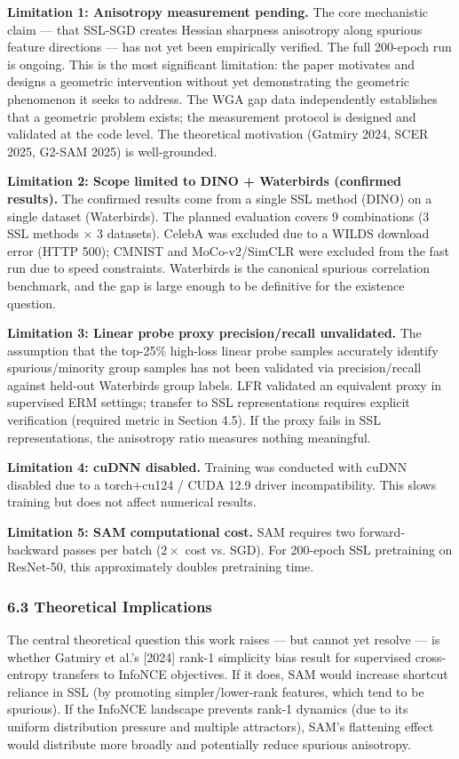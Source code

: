 \textbf{Limitation 1: Anisotropy measurement pending.}
The core mechanistic claim --- that SSL-SGD creates Hessian sharpness anisotropy along spurious feature directions --- has not yet been empirically verified. The full 200-epoch run is ongoing. This is the most significant limitation: the paper motivates and designs a geometric intervention without yet demonstrating the geometric phenomenon it seeks to address. The WGA gap data independently establishes that a geometric problem exists; the measurement protocol is designed and validated at the code level. The theoretical motivation (Gatmiry 2024, SCER 2025, G2-SAM 2025) is well-grounded.

\textbf{Limitation 2: Scope limited to DINO + Waterbirds (confirmed results).}
The confirmed results come from a single SSL method (DINO) on a single dataset (Waterbirds). The planned evaluation covers 9 combinations (3 SSL methods $\times$ 3 datasets). CelebA was excluded due to a WILDS download error (HTTP 500); CMNIST and MoCo-v2/SimCLR were excluded from the fast run due to speed constraints. Waterbirds is the canonical spurious correlation benchmark, and the gap is large enough to be definitive for the existence question.

\textbf{Limitation 3: Linear probe proxy precision/recall unvalidated.}
The assumption that the top-25\% high-loss linear probe samples accurately identify spurious/minority group samples has not been validated via precision/recall against held-out Waterbirds group labels. LFR \citep{ghaznavi2023lfr} validated an equivalent proxy in supervised ERM settings; transfer to SSL representations requires explicit verification (required metric in Section 4.5). If the proxy fails in SSL representations, the anisotropy ratio measures nothing meaningful.

\textbf{Limitation 4: cuDNN disabled.}
Training was conducted with cuDNN disabled due to a torch+cu124 / CUDA 12.9 driver incompatibility. This slows training but does not affect numerical results.

\textbf{Limitation 5: SAM computational cost.}
SAM requires two forward-backward passes per batch ($2\times$ cost vs. SGD). For 200-epoch SSL pretraining on ResNet-50, this approximately doubles pretraining time.

\subsubsection{6.3 Theoretical Implications}

The central theoretical question this work raises --- but cannot yet resolve --- is whether Gatmiry et al.'s [2024] rank-1 simplicity bias result for supervised cross-entropy transfers to InfoNCE objectives. If it does, SAM would increase shortcut reliance in SSL (by promoting simpler/lower-rank features, which tend to be spurious). If the InfoNCE landscape prevents rank-1 dynamics (due to its uniform distribution pressure and multiple attractors), SAM's flattening effect would distribute more broadly and potentially reduce spurious anisotropy.

